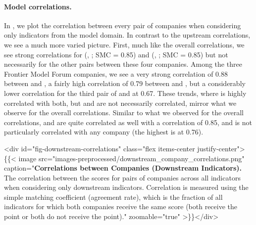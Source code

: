\documentclass[screen, authorversion, acmsmall]{acmart}
\begin{document}
\paragraph{Model correlations.}
In , we plot the correlation between every pair of companies when considering only indicators from the model domain.
In contrast to the upstream correlations, we see a much more varied picture.
First, much like the overall correlations, we see strong correlations for (\cohere, \aitwentyone; SMC = 0.85) and (\inflection, \amazon; SMC = 0.85) but not necessarily for the other pairs between these four companies. 
Among the three Frontier Model Forum companies, we see a very strong correlation of 0.88 between \google and \anthropic, a fairly high correlation of 0.79 between \openai and \anthropic, but a considerably lower correlation for the third pair of \openai and \google at 0.67.
These trends, where \anthropic is highly correlated with both, but \openai and \google are not necessarily correlated, mirror what we observe for the overall correlations.
Similar to what we observed for the overall correlations, \huggingface and \stability are quite correlated as well with a correlation of 0.85, and \meta is not particularly correlated with any company (the highest is \huggingface at 0.76).


<div id="fig-downstream-correlations" class="flex items-center justify-center">\{\{< image src="images-preprocessed/downstream_company_correlations.png" caption="\textbf{Correlations between Companies (Downstream Indicators).} The correlation between the scores for pairs of companies across all indicators when considering only downstream indicators. Correlation is measured using the simple matching coefficient (\ie agreement rate), which is the fraction of all indicators for which both companies receive the same score (\ie both receive the point or both do not receive the point)." zoomable="true" >\}\}</div>
\end{document}
